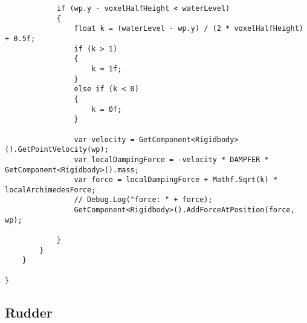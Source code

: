 \begin{lstlisting}
			if (wp.y - voxelHalfHeight < waterLevel)
			{
				float k = (waterLevel - wp.y) / (2 * voxelHalfHeight) + 0.5f;
				if (k > 1)
				{
					k = 1f;
				}
				else if (k < 0)
				{
					k = 0f;
				}

				var velocity = GetComponent<Rigidbody>().GetPointVelocity(wp);
				var localDampingForce = -velocity * DAMPFER * GetComponent<Rigidbody>().mass;
				var force = localDampingForce + Mathf.Sqrt(k) * localArchimedesForce;
                // Debug.Log("force: " + force);
				GetComponent<Rigidbody>().AddForceAtPosition(force, wp);

			}
		}
	}

}
\end{lstlisting}

\subsection{Rudder}\label{sec:rudder}

